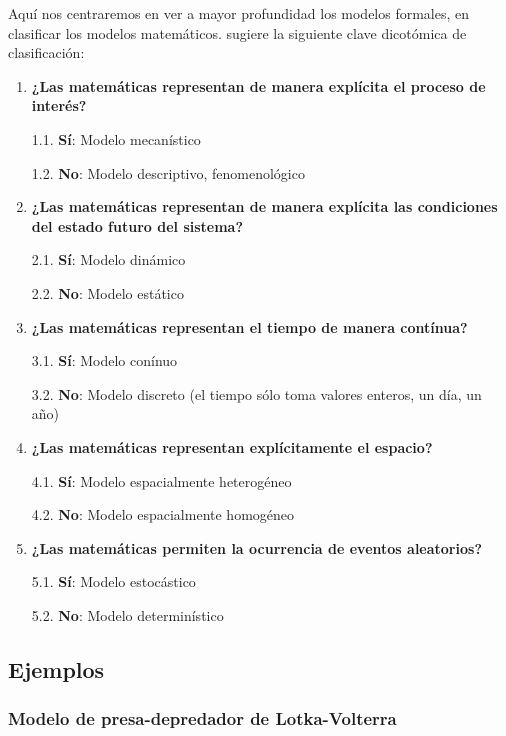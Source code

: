 \documentclass[
]{book}
\begin{document}
Aquí nos centraremos en ver a mayor profundidad los modelos formales, en clasificar los modelos matemáticos. \citet{haefner1998modeling} sugiere la siguiente clave dicotómica de clasificación:

\begin{enumerate}
\def\labelenumi{\arabic{enumi}.}
\item
  \textbf{¿Las matemáticas representan de manera explícita el proceso de interés?}

  1.1. \textbf{Sí}: Modelo mecanístico

  1.2. \textbf{No}: Modelo descriptivo, fenomenológico
\item
  \textbf{¿Las matemáticas representan de manera explícita las condiciones del estado futuro del sistema?}

  2.1. \textbf{Sí}: Modelo dinámico

  2.2. \textbf{No}: Modelo estático
\item
  \textbf{¿Las matemáticas representan el tiempo de manera contínua?}

  3.1. \textbf{Sí}: Modelo conínuo

  3.2. \textbf{No}: Modelo discreto (el tiempo sólo toma valores enteros, un día, un año)
\item
  \textbf{¿Las matemáticas representan explícitamente el espacio?}

  4.1. \textbf{Sí}: Modelo espacialmente heterogéneo

  4.2. \textbf{No}: Modelo espacialmente homogéneo
\item
  \textbf{¿Las matemáticas permiten la ocurrencia de eventos aleatorios?}

  5.1. \textbf{Sí}: Modelo estocástico

  5.2. \textbf{No}: Modelo determinístico
\end{enumerate}

\hypertarget{ejemplos-1}{%
\subsection{Ejemplos}\label{ejemplos-1}}

\hypertarget{modelo-de-presa-depredador-de-lotka-volterra--volterra1928variations}{%
\subsubsection{\texorpdfstring{Modelo de presa-depredador de Lotka-Volterra \citeyearpar{volterra1928variations}}{Modelo de presa-depredador de Lotka-Volterra {[}-@volterra1928variations{]}}}\label{modelo-de-presa-depredador-de-lotka-volterra--volterra1928variations}}
\end{document}
